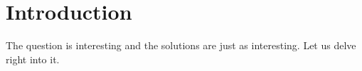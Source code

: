 \section{Introduction}
\label{sec:intro}
%
The question is interesting and the solutions are just as interesting. Let us 
delve right into it.